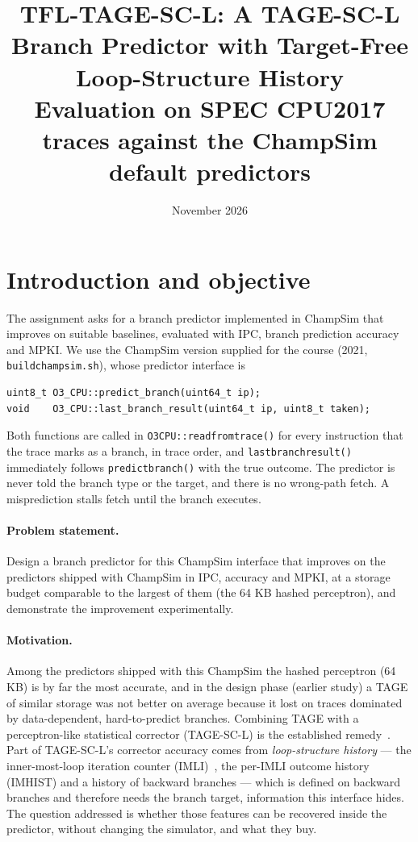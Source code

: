 \documentclass[11pt,a4paper]{article}
\title{\textbf{TFL-TAGE-SC-L: A TAGE-SC-L Branch Predictor with Target-Free Loop-Structure History}\\[4pt]
\large Evaluation on \val{n_traces} SPEC CPU2017 traces against the ChampSim default predictors}
\date{November 2026}
\newcommand{\code}[1]{\texttt{#1}}
\renewcommand{\_}{\textunderscore\allowbreak}
\begin{document}
\maketitle

\begin{abstract}

\end{abstract}

\tableofcontents
\newpage

\section{Introduction and objective}

The assignment asks for a branch predictor implemented in ChampSim that improves on suitable baselines, evaluated with IPC, branch prediction accuracy and MPKI. We use the ChampSim version supplied for the course (2021, \code{build\_champsim.sh}), whose predictor interface is
\begin{verbatim}
uint8_t O3_CPU::predict_branch(uint64_t ip);
void    O3_CPU::last_branch_result(uint64_t ip, uint8_t taken);
\end{verbatim}
Both functions are called in \code{O3\_CPU::read\_from\_trace()} for every instruction that the trace marks as a branch, in trace order, and \code{last\_branch\_result()} immediately follows \code{predict\_branch()} with the true outcome. The predictor is never told the branch type or the target, and there is no wrong-path fetch. A misprediction stalls fetch until the branch executes.

\paragraph{Problem statement.} Design a branch predictor for this ChampSim interface that improves on the predictors shipped with ChampSim in IPC, accuracy and MPKI, at a storage budget comparable to the largest of them (the 64 KB hashed perceptron), and demonstrate the improvement experimentally.

\paragraph{Motivation.} Among the predictors shipped with this ChampSim the hashed perceptron (64 KB) is by far the most accurate, and in the design phase (earlier study) a TAGE of similar storage was not better on average because it lost on traces dominated by data-dependent, hard-to-predict branches. Combining TAGE with a perceptron-like statistical corrector (TAGE-SC-L) is the established remedy~\cite{seznec2014tagescl,seznec2016tagescl}. Part of TAGE-SC-L's corrector accuracy comes from \emph{loop-structure history} --- the inner-most-loop iteration counter (IMLI)~\cite{seznec2015imli}, the per-IMLI outcome history (IMHIST) and a history of backward branches --- which is defined on backward branches and therefore needs the branch target, information this interface hides. The question addressed is whether those features can be recovered inside the predictor, without changing the simulator, and what they buy.
\end{document}
